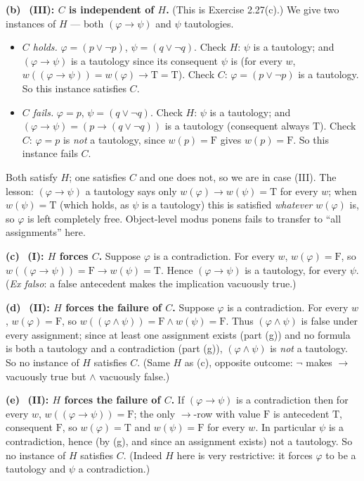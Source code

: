 \documentclass[11pt]{article}
\newcommand{\T}{\mathrm{T}}
\newcommand{\F}{\mathrm{F}}
\newcommand{\solpart}[1]{\smallskip\noindent\textbf{(#1)}\ }
\begin{document}
\solpart{b} \textbf{(III): $C$ is independent of $H$.} (This is Exercise 2.27(c).)
We give two instances of $H$ --- both $(\varphi\to\psi)$ and $\psi$ tautologies.
\begin{itemize}[nosep]
\item \emph{$C$ holds.} $\varphi=(p\lor\lnot p)$, $\psi=(q\lor\lnot q)$. Check $H$:
$\psi$ is a tautology; and $(\varphi\to\psi)$ is a tautology since its consequent
$\psi$ is (for every $w$, $w((\varphi\to\psi))=w(\varphi)\to\T=\T$). Check $C$:
$\varphi=(p\lor\lnot p)$ is a tautology. So this instance satisfies $C$.
\item \emph{$C$ fails.} $\varphi=p$, $\psi=(q\lor\lnot q)$. Check $H$: $\psi$ is a
tautology; and $(\varphi\to\psi)=(p\to(q\lor\lnot q))$ is a tautology (consequent
always $\T$). Check $C$: $\varphi=p$ is \emph{not} a tautology, since $w(p)=\F$
gives $w(p)=\F$. So this instance fails $C$.
\end{itemize}
Both satisfy $H$; one satisfies $C$ and one does not, so we are in case (III). The
lesson: $(\varphi\to\psi)$ a tautology says only $w(\varphi)\to w(\psi)=\T$ for
every $w$; when $w(\psi)=\T$ (which holds, as $\psi$ is a tautology) this is
satisfied \emph{whatever} $w(\varphi)$ is, so $\varphi$ is left completely free.
Object-level modus ponens fails to transfer to ``all assignments'' here.

\solpart{c} \textbf{(I): $H$ forces $C$.} Suppose $\varphi$ is a contradiction. For
every $w$, $w(\varphi)=\F$, so $w((\varphi\to\psi))=\F\to w(\psi)=\T$. Hence
$(\varphi\to\psi)$ is a tautology, for every $\psi$. (\emph{Ex falso}: a false
antecedent makes the implication vacuously true.)

\solpart{d} \textbf{(II): $H$ forces the failure of $C$.} Suppose $\varphi$ is a
contradiction. For every $w$, $w(\varphi)=\F$, so $w((\varphi\land\psi))=\F\land
w(\psi)=\F$. Thus $(\varphi\land\psi)$ is false under every assignment; since at
least one assignment exists (part (g)) and no formula is both a tautology and a
contradiction (part (g)), $(\varphi\land\psi)$ is \emph{not} a tautology. So no
instance of $H$ satisfies $C$. (Same $H$ as (c), opposite outcome: $\lnot$ makes
$\to$ vacuously true but $\land$ vacuously false.)

\solpart{e} \textbf{(II): $H$ forces the failure of $C$.} If $(\varphi\to\psi)$ is a
contradiction then for every $w$, $w((\varphi\to\psi))=\F$; the only $\to$-row with
value $\F$ is antecedent $\T$, consequent $\F$, so $w(\varphi)=\T$ and $w(\psi)=\F$
for every $w$. In particular $\psi$ is a contradiction, hence (by (g), and since an
assignment exists) not a tautology. So no instance of $H$ satisfies $C$. (Indeed
$H$ here is very restrictive: it forces $\varphi$ to be a tautology and $\psi$ a
contradiction.)
\end{document}

